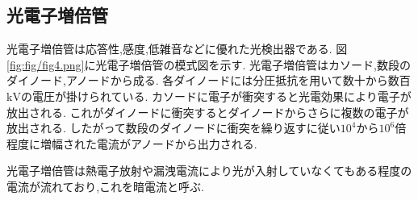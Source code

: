 \subsection{光電子増倍管}
光電子増倍管は応答性,感度,低雑音などに優れた光検出器である.
図\ref{fig:fig/fig4.png}に光電子増倍管の模式図を示す.
光電子増倍管はカソード,数段のダイノード,アノードから成る.
各ダイノードには分圧抵抗を用いて数十から数百$\si{\kilo\volt}$の電圧が掛けられている.
カソードに電子が衝突すると光電効果により電子が放出される.
これがダイノードに衝突するとダイノードからさらに複数の電子が放出される.
したがって数段のダイノードに衝突を繰り返すに従い$10^4$から$10^6$倍程度に増幅された電流がアノードから出力される.

光電子増倍管は熱電子放射や漏洩電流により光が入射していなくてもある程度の電流が流れており,これを暗電流と呼ぶ.

